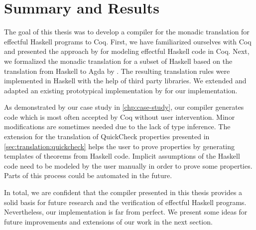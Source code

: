 \section{Summary and Results} \label{sec:conclusion:summary}
The goal of this thesis was to develop a compiler for the monadic translation for effectful Haskell programs to Coq.
First, we have familiarized ourselves with Coq and presented the approach by \cite{Dylus:2018} for modeling effectful Haskell code in Coq.
Next, we formalized the monadic translation for a subset of Haskell based on the translation from Haskell to Agda by \cite{Abel:2005}.
The resulting translation rules were implemented in Haskell with the help of third party libraries.
We extended and adapted an existing prototypical implementation by \cite{Jessen:2019} for our implementation.

As demonstrated by our case study in \autoref{chp:case-study}, our compiler generates code which is most often accepted by Coq without user intervention.
Minor modifications are sometimes needed due to the lack of type inference.
The extension for the translation of QuickCheck properties presented in \autoref{sec:translation:quickcheck} helps the user to prove properties by generating templates of theorems from Haskell code.
Implicit assumptions of the Haskell code need to be modeled by the user manually in order to prove some properties.
Parts of this process could be automated in the future.

In total, we are confident that the compiler presented in this thesis provides a solid basis for future research and the verification of effectful Haskell programs.
Nevertheless, our implementation is far from perfect.
We present some ideas for future improvements and extensions of our work in the next section.
